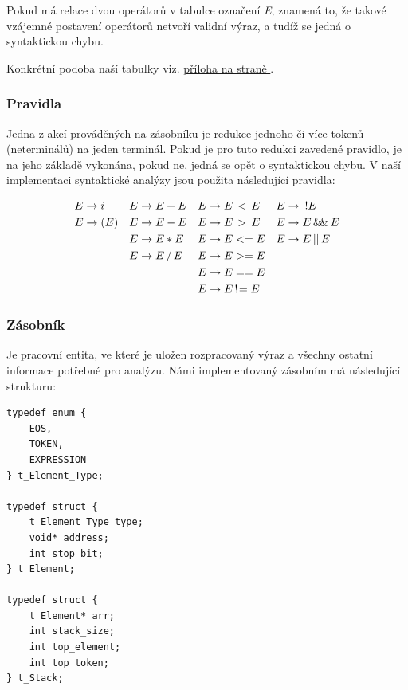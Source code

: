 \documentclass[a4paper,11pt]{article}
\begin{document}
Pokud má relace dvou operátorů v tabulce označení \textit{E}, znamená to, že takové vzájemné postavení operátorů netvoří validní výraz, a tudíž se jedná o syntaktickou chybu.

Konkrétní podoba naší tabulky viz. \hyperref[tab:SA-precedence]{příloha na straně \pageref{tab:SA-precedence}}.

\subsubsection{Pravidla}
Jedna z akcí prováděných na zásobníku je redukce jednoho či více tokenů (neterminálů) na jeden terminál. Pokud je pro tuto redukci zavedené pravidlo, je na jeho základě vykonána, pokud ne, jedná se opět o syntaktickou chybu. V naší implementaci syntaktické analýzy jsou použita následující pravidla:

\begin{align*}
E &\rightarrow i      &  E &\rightarrow E + E                      &  E &\rightarrow E \thinspace<\thinspace E    &  E &\rightarrow \enspace !E    \\
E &\rightarrow ( E )  &  E &\rightarrow E - E                      &  E &\rightarrow E \thinspace>\thinspace E    &  E &\rightarrow E \thinspace \&\!\& \thinspace E\\
  &                   &  E &\rightarrow E * E                      &  E &\rightarrow E <= E                       &  E &\rightarrow E \thinspace || \thinspace E\\
  &                   &  E &\rightarrow E\thinspace/\thinspace E   &  E &\rightarrow E >= E                       &    &                 \\
  &                   &    &                                       &  E &\rightarrow E == E                       &    &                 \\
  &                   &    &                                       &  E &\rightarrow E\thinspace!\!= E            &    &                 \\
\end{align*}

\subsubsection{Zásobník}
Je pracovní entita, ve které je uložen rozpracovaný výraz a všechny ostatní informace potřebné pro analýzu. Námi implementovaný zásobním má následující strukturu:

\begin{lstlisting}[caption={Struktura zásobníku}, label={lst:saStack}]
typedef enum {
    EOS,
    TOKEN,
    EXPRESSION
} t_Element_Type;

typedef struct {
    t_Element_Type type;
    void* address;
    int stop_bit;
} t_Element;

typedef struct {
    t_Element* arr;
    int stack_size;
    int top_element;
    int top_token;
} t_Stack;

\end{lstlisting}
\end{document}
